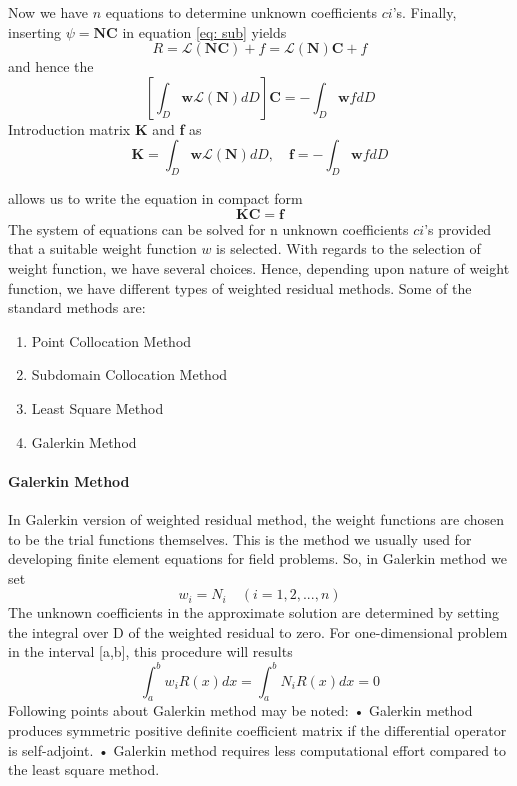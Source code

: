 Now we have $n$ equations to determine unknown coefficients $ci$’s. Finally, inserting $\psi = \boldsymbol{NC}$ in
equation \ref{eq: sub} yields
\begin{equation}
R=\mathscr{L}(\boldsymbol{NC})+f=\mathscr{L}\boldsymbol{(N)C}+f
\end{equation}
and hence the 
\begin{equation}
\left[\int_D \boldsymbol{w}\mathscr{L}(\boldsymbol{N})dD\right]\boldsymbol{C}=-\int_D\boldsymbol{w}fdD
\end{equation}
Introduction matrix \textbf{K} and \textbf{f }as
\begin{equation}
\boldsymbol{K}=\int_D \boldsymbol{w}\mathscr{L}(\boldsymbol{N})dD, \quad \boldsymbol{f}=-\int_D\boldsymbol{w}fdD
\end{equation}

allows us to write the equation in compact form 
\begin{equation}
\boldsymbol{KC=f}
\end{equation}
The system of equations can be solved for n unknown coefficients $ci$’s provided that a suitable weight function $w$ is selected.
With regards to the selection of weight function, we have several choices. Hence, depending
upon nature of weight function, we have different types of weighted residual methods. Some of
the standard methods are:
\begin{enumerate}
\item Point Collocation Method
\item  Subdomain Collocation Method
\item  Least Square Method
\item  Galerkin Method
\end{enumerate}

\paragraph{Galerkin Method}
In Galerkin version of weighted residual method, the weight functions are chosen to be the trial
functions themselves. This is the method we usually used for developing finite element equations
for field problems. So, in Galerkin method we set
\begin{equation}
w_i=N_i \quad (i=1,2,...,n)
\end{equation}
The unknown coefficients in the approximate solution are determined by setting the integral
over D of the weighted residual to zero. For one-dimensional problem in the interval [a,b], this
procedure will results
\begin{equation}
\int_a^bw_iR(x)dx=\int_a^bN_iR(x)dx=0
\end{equation}Following points about Galerkin method may be noted:
• Galerkin method produces symmetric positive definite coefficient matrix if the differential
operator is self-adjoint.
• Galerkin method requires less computational effort compared to the least square method.
